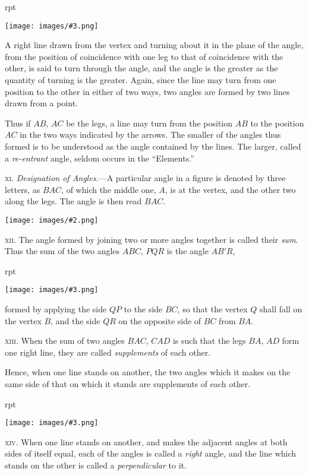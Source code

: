 \documentclass[oneside]{book}
\newcounter{wrapwidth}
\newcommand\imgflow[3]{
\setcounter{wrapwidth}{#1}
\begin{wrapfigure}[#2]{r}{\value{wrapwidth}pt}
\begin{center}
\vspace{-0.3in}
\texttt{[image: images/\#3.png]}
\end{center}
\end{wrapfigure}
}
\newcommand\imgcent[2]{
\begin{center}
\texttt{[image: images/\#2.png]}
\end{center}
}
\begin{document}
\imgflow{113}{11}{f001}
\begin{footnotesize}
A right line drawn from the vertex and turning about it in the
plane of the angle, from the position of coincidence with one leg
to that of coincidence with the other, is said to turn through the
angle, and the angle is the greater as the quantity of turning is
the greater. Again, since the line may turn from one position to
the other in either of two ways, two angles are formed by two
lines drawn from a point.

Thus if $AB$, $AC$ be the legs, a line
may turn from the position $AB$ to the
position $AC$ in the two ways indicated
by the arrows. The smaller of the angles
thus formed is to be understood as
the angle contained by the lines. The
larger, called a \textit{re-entrant} angle, seldom
occurs in the ``Elements.''
\par\end{footnotesize}

\textsc{xi.} \textit{Designation of Angles.}---A particular angle in a
figure is denoted by three letters, as $BAC$, of which the
middle one, $A$, is at the vertex, and the other two along
the legs. The angle is then read $BAC$.

\imgcent{300}{f002}

\textsc{xii.} The angle formed by joining two or more angles
together is called their \textit{sum}. Thus the sum of the two
angles $ABC$, $PQR$ is the angle $AB'R$,
\imgflow{129}{7}{f003}
formed by applying
the side $QP$ to the side $BC$, so that the vertex $Q$ shall
fall on the vertex $B$, and the
side $QR$ on the opposite side
of $BC$ from $BA$.

\textsc{xiii.} When the sum of two
angles $BAC$, $CAD$ is such that
the legs $BA$, $AD$ form one right
line, they are called \textit{supplements} of each other.

\begin{footnotesize}
Hence, when one line stands on another, the two angles which
it makes on the same side of that on which it stands are supplements
of each other.
\par\end{footnotesize}


\imgflow{121}{7}{f004}
\textsc{xiv}. When one line stands on another, and makes
the adjacent angles at both
sides of itself equal, each of
the angles is called a \textit{right}
angle, and the line which
stands on the other is called
a \textit{perpendicular} to it.
\end{document}
